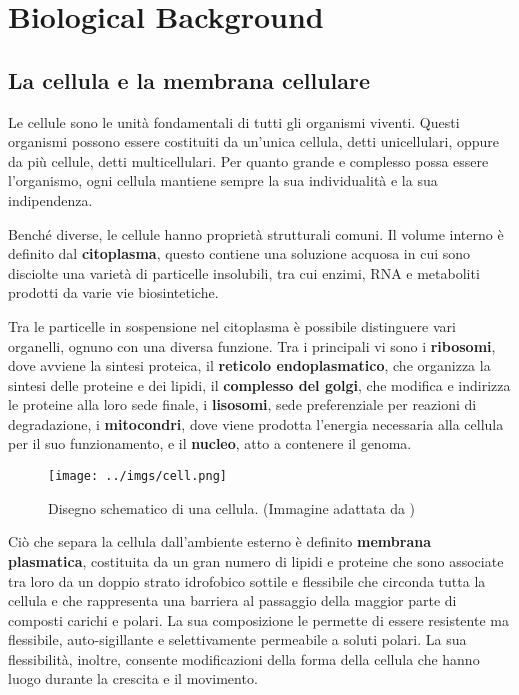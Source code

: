 \chapter{Biological Background}



\section{La cellula e la membrana cellulare}
\label{sec:cell}
Le cellule sono le unità fondamentali di tutti gli organismi viventi.
Questi organismi possono essere costituiti da un'unica cellula, detti unicellulari, oppure da più cellule, detti multicellulari.
Per quanto grande e complesso possa essere l'organismo, ogni cellula mantiene sempre la sua individualità e la sua indipendenza.

Benché diverse, le cellule hanno proprietà strutturali comuni.
Il volume interno è definito dal \textbf{citoplasma}, questo contiene una soluzione acquosa in cui sono disciolte una varietà di particelle insolubili, tra cui enzimi, RNA e metaboliti prodotti da varie vie biosintetiche.

Tra le particelle in sospensione nel citoplasma è possibile distinguere vari organelli, ognuno con una diversa funzione.
Tra i principali vi sono i \textbf{ribosomi}, dove avviene la sintesi proteica, il \textbf{reticolo endoplasmatico}, che organizza la sintesi delle proteine e dei lipidi, il \textbf{complesso del golgi}, che modifica e indirizza le proteine alla loro sede finale, i \textbf{lisosomi}, sede preferenziale per reazioni di degradazione, i \textbf{mitocondri}, dove viene prodotta l'energia necessaria alla cellula per il suo funzionamento, e il \textbf{nucleo}, atto a contenere il genoma.\cite{nelsonprincipi}

\begin{figure}[h]
\begin{center}
\texttt{[image: ../imgs/cell.png]}
\caption[La cellula]{Disegno schematico di una cellula. (Immagine adattata da \cite{nelsonprincipi})}
\label{Fig:cell}
\end{center}
\end{figure}

Ciò che separa la cellula dall'ambiente esterno è definito \textbf{membrana plasmatica}, costituita da un gran numero di lipidi e proteine che sono associate tra loro da un doppio strato idrofobico sottile e flessibile che circonda tutta la cellula e che rappresenta una barriera al passaggio della maggior parte di composti carichi e polari. 
La sua composizione le permette di essere resistente ma flessibile, auto-sigillante e selettivamente permeabile a soluti polari. 
La sua flessibilità, inoltre, consente modificazioni della forma della cellula che hanno luogo durante la crescita e il movimento.

